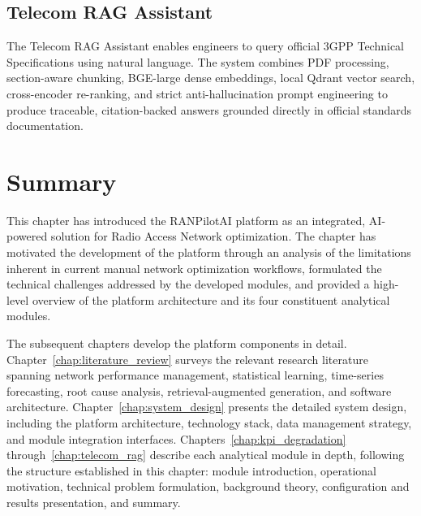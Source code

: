 \subsection{Telecom RAG Assistant}

The Telecom RAG Assistant enables engineers to query official 3GPP Technical Specifications using natural language. The system combines PDF processing, section-aware chunking, BGE-large dense embeddings, local Qdrant vector search, cross-encoder re-ranking, and strict anti-hallucination prompt engineering to produce traceable, citation-backed answers grounded directly in official standards documentation.

\section{Summary}

This chapter has introduced the RANPilotAI platform as an integrated, AI-powered solution for Radio Access Network optimization. The chapter has motivated the development of the platform through an analysis of the limitations inherent in current manual network optimization workflows, formulated the technical challenges addressed by the developed modules, and provided a high-level overview of the platform architecture and its four constituent analytical modules.

The subsequent chapters develop the platform components in detail. Chapter~\ref{chap:literature_review} surveys the relevant research literature spanning network performance management, statistical learning, time-series forecasting, root cause analysis, retrieval-augmented generation, and software architecture. Chapter~\ref{chap:system_design} presents the detailed system design, including the platform architecture, technology stack, data management strategy, and module integration interfaces. Chapters~\ref{chap:kpi_degradation} through~\ref{chap:telecom_rag} describe each analytical module in depth, following the structure established in this chapter: module introduction, operational motivation, technical problem formulation, background theory, configuration and results presentation, and summary.
